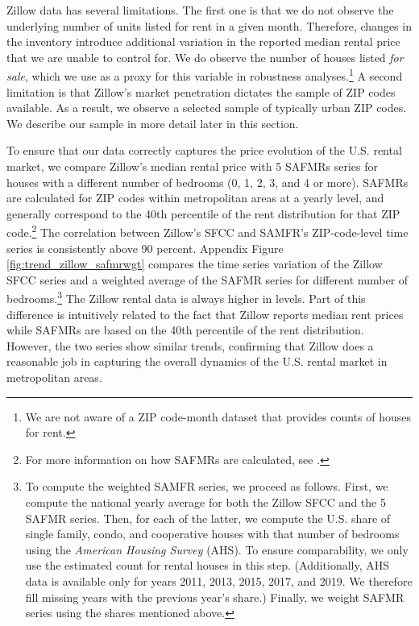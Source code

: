Zillow data has several limitations. The first one is that we do not observe the 
underlying number of units listed for rent in a given month. Therefore, changes in the 
inventory introduce additional variation in the reported median rental price that we 
are unable to control for. We do observe the number of houses listed \textit{for sale}, 
which we use as a proxy for this variable in robustness analyses.\footnote{We are not 
	aware of a ZIP code-month dataset that provides counts of houses for rent.}
A second limitation is that Zillow's market penetration dictates the sample of ZIP codes 
available. As a result, we observe a selected sample of typically urban ZIP codes.
We describe our sample in more detail later in this section.

To ensure that our data correctly captures the price evolution of the U.S. rental market, 
we compare Zillow's median rental price with 5 SAFMRs series for houses with a different 
number of bedrooms (0, 1, 2, 3, and 4 or more). SAFMRs are calculated for ZIP codes within 
metropolitan areas at a yearly level, and generally correspond to the 40th percentile of 
the rent distribution for that ZIP code.\footnote{For more information on how SAFMRs are 
	calculated, see \textcite[][page 41641]{hudPreamble}.} 
The correlation between Zillow's SFCC and SAMFR's ZIP-code-level time series is 
consistently above 90 percent. Appendix Figure \ref{fig:trend_zillow_safmrwgt} compares the 
time series variation of the Zillow SFCC series and a weighted average of the SAFMR series 
for different number of bedrooms.\footnote{	\label{foot:zillow_time_series}
	To compute the weighted SAMFR series, we proceed as follows. First, we compute the 
	national yearly average for both the Zillow SFCC and the 5 SAFMR series. Then, for 
	each of the latter, we compute the U.S. share of single family, condo, and cooperative 
	houses with that number of bedrooms using the \textit{American Housing Survey} (AHS). 
	To ensure comparability, we only use the estimated count for rental houses in this 
	step. (Additionally, AHS data is available only for years 2011, 2013, 2015, 2017, and 
	2019. We therefore fill missing years with the previous year's share.) Finally, we 
	weight SAFMR series using the shares mentioned above.} 
The Zillow rental data is always higher in levels. Part of this difference is intuitively 
related to the fact that Zillow reports median rent prices while SAFMRs are based on the 
40th percentile of the rent distribution. However, the two series show similar trends, 
confirming that Zillow does a reasonable job in capturing the overall dynamics of the U.S. 
rental market in metropolitan areas.

